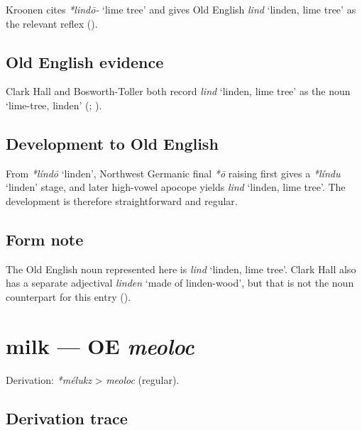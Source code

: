 \documentclass[
  british,
  a4paper,
  openany]{book}
\providecommand{\Recon}[1]{\emph{*#1}}
{\catcode`→=\active \global\def→{\ensuremath{\rightarrow}}}
\providecommand{\texorpdfstring}[2]{#1}
\providecommand{\Recon}[1]{\emph{*#1}}
{\catcode`→=\active \global\def→{\ensuremath{\rightarrow}}}
\begin{document}
Kroonen cites \emph{*lindō-} `lime tree' and gives Old English
{\emph{lind}} `linden, lime tree' as the relevant reflex
().

\subsection{Old English evidence}\label{old-english-evidence-37}

Clark Hall and Bosworth-Toller both record {\emph{lind}} `linden, lime
tree' as the noun `lime-tree, linden'
(;
).

\subsection{Development to Old
English}\label{development-to-old-english-37}

From \Recon{líndō} `linden', Northwest Germanic final \emph{*ō} raising
first gives a \Recon{líndu} `linden' stage, and later high-vowel apocope
yields {\emph{lind}} `linden, lime tree'. The development is therefore
straightforward and regular.

\subsection{Form note}\label{form-note-12}

The Old English noun represented here is {\emph{lind}} `linden, lime
tree'. Clark Hall also has a separate adjectival \emph{linden} `made of
linden-wood', but that is not the noun counterpart for this entry
().

\section{\texorpdfstring{milk --- OE
\emph{meoloc}}{milk --- OE meoloc}}\label{milk-oe-meoloc}


Derivation: \emph{*mélukz} \textgreater{} \emph{meoloc} (regular).

\subsection{Derivation trace}\label{derivation-trace-38}
\end{document}
